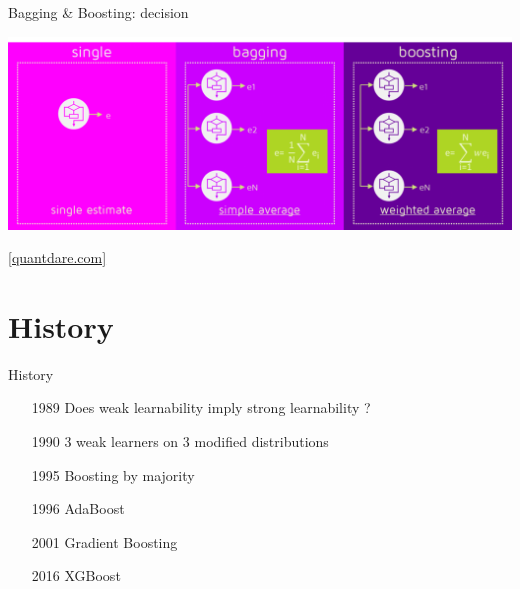 \documentclass[handout]{beamer}
\newcommand{\hreftextsize}{\footnotesize}
\newcommand{\myhref}[2]{\href{#1}{\hreftextsize #2}}
\begin{document}
\begin{frame}{Bagging \& Boosting: decision}
\begin{center}
	\includegraphics[width=\textwidth]{figs/bagg_boost_decide}
	
	\myhref{https://quantdare.com/what-is-the-difference-between-bagging-and-boosting/}{[quantdare.com]}
\end{center}
\end{frame}



\section{History}

\begin{frame}{History}
\begin{itemize}
	\item[1989] Does weak learnability imply strong learnability \cite{KearnsValiant1994}?
	
	\item[1990] 3 weak learners on 3 modified distributions \cite{Schapire1990}
	
	\item[1995] Boosting by majority \cite{Freund1995}
	
	\item[1996] AdaBoost \cite{FreundSchapire1996}
	
	\item[2001] Gradient Boosting \cite{Friedman2001}
	
	\item[2016] XGBoost \cite{ChenGuestrin2016}
\end{itemize}
\end{frame}
\end{document}
